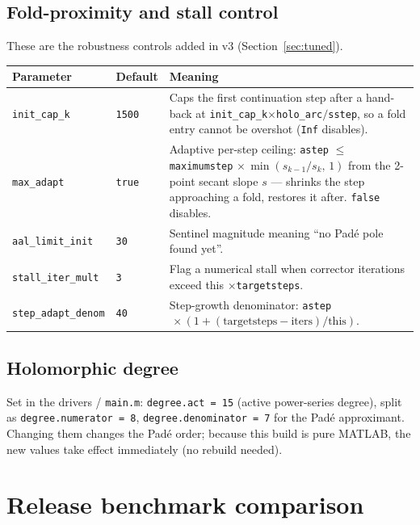 \documentclass[11pt,a4paper]{article}
\newcommand{\code}[1]{\texttt{#1}}
\begin{document}
\subsection{Fold-proximity and stall control}
These are the robustness controls added in v3 (Section~\ref{sec:tuned}).
\begin{center}\small
\begin{longtable}{@{}p{}p{}p{}@{}}
\toprule
\textbf{Parameter} & \textbf{Default} & \textbf{Meaning}\\
\midrule\endhead
\code{init_cap_k}    & \code{1500} & Caps the first continuation step after a hand-back at \code{init_cap_k}$\times$\code{holo_arc}$/$\code{sstep}, so a fold entry cannot be overshot (\code{Inf} disables).\\
\code{max_adapt}     & \code{true} & Adaptive per-step ceiling: \code{astep} $\le$ \code{maximumstep}$\,\times\min(s_{k-1}/s_k,\,1)$ from the 2-point secant slope $s$ --- shrinks the step approaching a fold, restores it after. \code{false} disables.\\
\code{aal_limit_init}& \code{30}   & Sentinel magnitude meaning ``no Pad\'e pole found yet''.\\
\code{stall_iter_mult}& \code{3}   & Flag a numerical stall when corrector iterations exceed this $\times$\code{targetsteps}.\\
\code{step_adapt_denom}& \code{40} & Step-growth denominator: \code{astep}$\,\times(1+(\text{targetsteps}-\text{iters})/\text{this})$.\\
\bottomrule
\end{longtable}
\end{center}

\subsection{Holomorphic degree}
Set in the drivers / \code{main.m}: \code{degree.act = 15} (active power-series degree),
split as \code{degree.numerator = 8}, \code{degree.denominator = 7} for the Pad\'e
approximant. Changing them changes the Pad\'e order; because this build is pure MATLAB,
the new values take effect immediately (no rebuild needed).

\section{Release benchmark comparison}\label{sec:benchmark}
\end{document}
